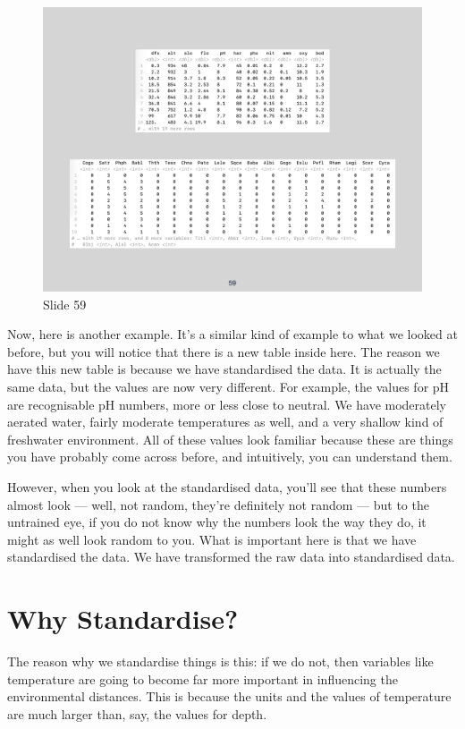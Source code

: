 \documentclass[
  12pt,
]{book}
\begin{document}
\begin{figure}[ht]
\centering
\includegraphics[width=0.8\linewidth]{../images/BDC334/BDC334-059.jpeg}
\caption*{Slide 59}
\end{figure}

Now, here is another example. It's a similar kind of example to what we
looked at before, but you will notice that there is a new table inside
here. The reason we have this new table is because we have standardised
the data. It is actually the same data, but the values are now very
different. For example, the values for pH are recognisable pH numbers,
more or less close to neutral. We have moderately aerated water, fairly
moderate temperatures as well, and a very shallow kind of freshwater
environment. All of these values look familiar because these are things
you have probably come across before, and intuitively, you can
understand them.

However, when you look at the standardised data, you'll see that these
numbers almost look --- well, not random, they're definitely not random
--- but to the untrained eye, if you do not know why the numbers look
the way they do, it might as well look random to you. What is important
here is that we have standardised the data. We have transformed the raw
data into standardised data.

\section{Why Standardise?}\label{why-standardise}

The reason why we standardise things is this: if we do not, then
variables like temperature are going to become far more important in
influencing the environmental distances. This is because the units and
the values of temperature are much larger than, say, the values for
depth.
\end{document}
